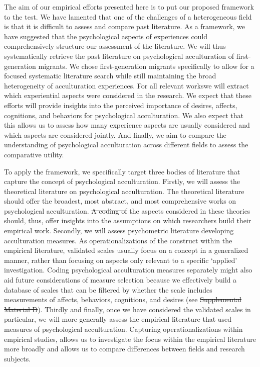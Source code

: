 \documentclass[man, 12pt, a4paper, mask]{apa7}
\newcommand{\sidirectory}{Supplemental Material C} %
\providecommand{\DIFaddtex}[1]{{\protect\color{blue}\uwave{#1}}} %
\providecommand{\DIFdeltex}[1]{{\protect\color{red}\sout{#1}}}                      %
\providecommand{\DIFaddbegin}{} %
\providecommand{\DIFaddend}{} %
\providecommand{\DIFdelbegin}{} %
\providecommand{\DIFdelend}{} %
\providecommand{\DIFadd}[1]{\texorpdfstring{\DIFaddtex{#1}}{#1}} %
\providecommand{\DIFdel}[1]{\texorpdfstring{\DIFdeltex{#1}}{}} %
\newcommand{\DIFscaledelfig}{0.5}
\newlength{\DIFdelgraphicswidth} %
\newlength{\DIFdelgraphicsheight} %
\newcommand{\DIFaddincludegraphics}[2][]{{\color{blue}\fbox{\DIFOincludegraphics[#1]{#2}}}} %
\newcommand{\DIFdelincludegraphics}[2][]{%
\sbox{\DIFdelgraphicsbox}{\DIFOincludegraphics[#1]{#2}}%
\settoboxwidth{\DIFdelgraphicswidth}{\DIFdelgraphicsbox} %
\settoboxtotalheight{\DIFdelgraphicsheight}{\DIFdelgraphicsbox} %
\scalebox{\DIFscaledelfig}{%
\parbox[b]{\DIFdelgraphicswidth}{\usebox{\DIFdelgraphicsbox}\\[-\baselineskip] \rule{\DIFdelgraphicswidth}{0em}}\llap{\resizebox{\DIFdelgraphicswidth}{\DIFdelgraphicsheight}{%
\setlength{\unitlength}{\DIFdelgraphicswidth}%
\begin{picture}(1,1)%
\thicklines\linethickness{2pt} %
{\color[rgb]{1,0,0}\put(0,0){\framebox(1,1){}}}%
{\color[rgb]{1,0,0}\put(0,0){\line( 1,1){1}}}%
{\color[rgb]{1,0,0}\put(0,1){\line(1,-1){1}}}%
\end{picture}%
}\hspace*{3pt}}} %
} %
\DeclareRobustCommand{\DIFaddbegin}{\DIFOaddbegin \let\includegraphics\DIFaddincludegraphics} %
\DeclareRobustCommand{\DIFaddend}{\DIFOaddend \let\includegraphics\DIFOincludegraphics} %
\DeclareRobustCommand{\DIFdelbegin}{\DIFOdelbegin \let\includegraphics\DIFdelincludegraphics} %
\DeclareRobustCommand{\DIFdelend}{\DIFOaddend \let\includegraphics\DIFOincludegraphics} %
\begin{document}
The aim of our empirical efforts presented here is to put our proposed framework to the test. We have lamented that one of the challenges of a heterogeneous field is that it is difficult to assess and compare past literature. As a framework, we have suggested that the psychological aspects of experiences could comprehensively structure our assessment of the literature. We will thus systematically retrieve the past literature on psychological acculturation of first-generation migrants. We chose first-generation migrants specifically to allow for a focused systematic literature search while still maintaining the broad heterogeneity of acculturation experiences. For all relevant works\DIFaddbegin \DIFadd{, }\DIFaddend we will extract which experiential aspects were considered in the research. We expect that these efforts will provide insights into the perceived importance of desires, affects, cognitions, and behaviors for psychological acculturation. We also expect that this allows us to assess how many experience aspects are usually considered and which aspects are considered jointly. And finally, we aim to compare the understanding of psychological acculturation across different fields to assess the comparative utility. 

To apply the framework, we specifically target three bodies of literature that capture the concept of psychological acculturation. Firstly, we will assess the theoretical literature on psychological acculturation. The theoretical literature should offer the broadest, most abstract, and most comprehensive works on psychological acculturation. \DIFdelbegin \DIFdel{A coding of }\DIFdelend \DIFaddbegin \DIFadd{Coding }\DIFaddend the aspects considered in these theories should, thus, offer insights into the assumptions on which researchers build their empirical work.
Secondly, we will assess psychometric literature developing acculturation measures. As operationalizations of the construct within the empirical literature, validated scales usually focus on a concept in a generalized manner, rather than focusing on aspects only relevant to a specific `applied' investigation. Coding psychological acculturation measures separately might also aid future considerations of measure selection because we effectively build a database of scales that can be filtered by whether the scale includes measurements of affects, behaviors, cognitions, and desires (see \DIFdelbegin \DIFdel{Supplemental Material D}\DIFdelend \DIFaddbegin \DIFadd{\sidirectory}\DIFaddend ). 
Thirdly and finally, once we have considered the validated scales in particular, we will more generally assess the empirical literature that used measures of psychological acculturation. Capturing operationalizations within empirical studies, allows us to investigate the focus within the empirical literature more broadly and allows us to compare differences between fields and research subjects.
\end{document}
